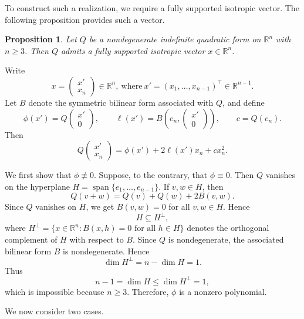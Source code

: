 \documentclass[12pt,reqno]{amsart}
\newtheorem{prop}[thm]{Proposition}
\theoremstyle{definition}
\numberwithin{equation}{subsection}
\newenvironment{pf}{\proof}{\endproof}
\numberwithin{equation}{section}
\begin{document}
To construct such a realization, we require a fully supported isotropic vector. The following proposition provides such a vector.
\begin{prop}\label{prop: nonzero isotropic vector}
Let $Q$ be a nondegenerate indefinite quadratic form on $\mathbb{R}^n$ with
$n\ge3$. Then $Q$ admits a fully supported isotropic vector $x \in \mathbb{R}^n$.
\end{prop}

\begin{pf}
Write $$x=\begin{pmatrix}x'\\x_n\end{pmatrix}\in\mathbb{R}^n,\  \text{where}
\
x'=(x_1,\dots,x_{n-1})^\top\in\mathbb{R}^{n-1}.
$$
Let $B$ denote the symmetric bilinear form associated with $Q$, and define
\[
\phi(x')=Q\begin{pmatrix}x'\\0\end{pmatrix},\qquad
\ell(x')=B\left(e_n,\begin{pmatrix}x'\\0\end{pmatrix}\right),\qquad
c=Q(e_n).
\]
Then
\begin{equation}\label{eq:Q-decomposition}
Q\begin{pmatrix}x'\\x_n\end{pmatrix}
=
\phi(x')+2\ell(x')x_n+cx_n^2.
\end{equation}

We first show that $\phi\not\equiv 0$. Suppose, to the contrary, that
$\phi\equiv 0$. Then $Q$ vanishes on the hyperplane
\(
H=\operatorname{span}\{e_1,\dots,e_{n-1}\}.
\)
If $v,w\in H$, then
\[
Q(v+w)=Q(v)+Q(w)+2B(v,w).
\]
Since $Q$ vanishes on $H$, we get $B(v,w)=0$ for all $v,w\in H$. Hence
\[
H\subseteq H^\perp,
\]
where
\(
H^\perp=\{x\in\mathbb{R}^n:B(x,h)=0\text{ for all }h\in H\}
\)
denotes the orthogonal complement of $H$ with respect to $B$.
Since $Q$ is nondegenerate, the associated bilinear form $B$ is nondegenerate. Hence
\[
\dim H^\perp=n-\dim H=1.
\]
Thus
\[
n-1=\dim H\le \dim H^\perp=1,
\]
which is impossible because $n\ge 3$. Therefore, $\phi$ is a nonzero polynomial.

We now consider two cases.

\medskip


\end{pf}
\end{document}

